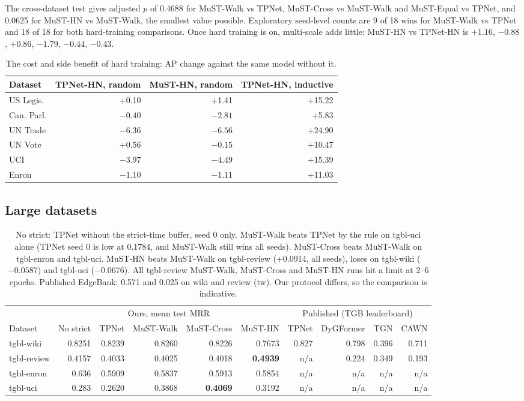 \documentclass[11pt,a4paper]{article}
\theoremstyle{remark}
\begin{document}
The cross-dataset test gives adjusted $p$ of 0.4688 for MuST-Walk vs TPNet, MuST-Cross vs MuST-Walk and MuST-Equal vs TPNet, and 0.0625 for MuST-HN vs MuST-Walk, the smallest value possible. Exploratory seed-level counts are 9 of 18 wins for MuST-Walk vs TPNet and 18 of 18 for both hard-training comparisons. Once hard training is on, multi-scale adds little: MuST-HN vs TPNet-HN is $+1.16$, $-0.88$, $+0.86$, $-1.79$, $-0.44$, $-0.43$.

\begin{table}[h]\centering\small
\begin{tabular}{lrrr}
\toprule
Dataset & TPNet-HN, random & MuST-HN, random & TPNet-HN, inductive\\
\midrule
US Legis. & +0.10 & +1.41 & +15.22\\
Can. Parl. & $-0.40$ & $-2.81$ & +5.83\\
UN Trade & $-6.36$ & $-6.56$ & +24.90\\
UN Vote & +0.56 & $-0.15$ & +10.47\\
UCI & $-3.97$ & $-4.49$ & +15.39\\
Enron & $-1.10$ & $-1.11$ & +11.03\\
\bottomrule
\end{tabular}
\caption{The cost and side benefit of hard training: AP change against the same model without it.}\label{tab:cost}
\end{table}

\subsection{Large datasets}
\begin{table}[h]\centering\small
\setlength{\tabcolsep}{3.6pt}\begin{tabular}{lrrrrr|rrrr}
\toprule
 & \multicolumn{5}{c|}{Ours, mean test MRR} & \multicolumn{4}{c}{Published (TGB leaderboard)}\\
Dataset & No strict & TPNet & MuST-Walk & MuST-Cross & MuST-HN & TPNet & DyGFormer & TGN & CAWN\\
\midrule
tgbl-wiki & 0.8251 & 0.8239 & 0.8260 & 0.8226 & 0.7673 & 0.827 & 0.798 & 0.396 & 0.711\\
tgbl-review & 0.4157 & 0.4033 & 0.4025 & 0.4018 & \textbf{0.4939} & n/a & 0.224 & 0.349 & 0.193\\
tgbl-enron & 0.636 & 0.5909 & 0.5837 & 0.5913 & 0.5854 & n/a & n/a & n/a & n/a\\
tgbl-uci & 0.283 & 0.2620 & 0.3868 & \textbf{0.4069} & 0.3192 & n/a & n/a & n/a & n/a\\
\bottomrule
\end{tabular}
\caption{No strict: TPNet without the strict-time buffer, seed 0 only. MuST-Walk beats TPNet by the rule on tgbl-uci alone (TPNet seed 0 is low at 0.1784, and MuST-Walk still wins all seeds). MuST-Cross beats MuST-Walk on tgbl-enron and tgbl-uci. MuST-HN beats MuST-Walk on tgbl-review (+0.0914, all seeds), loses on tgbl-wiki ($-0.0587$) and tgbl-uci ($-0.0676$). All tgbl-review MuST-Walk, MuST-Cross and MuST-HN runs hit a limit at 2--6 epochs. Published EdgeBank: 0.571 and 0.025 on wiki and review (tw). Our protocol differs, so the comparison is indicative.}\label{tab:tgb}
\end{table}
\end{document}
